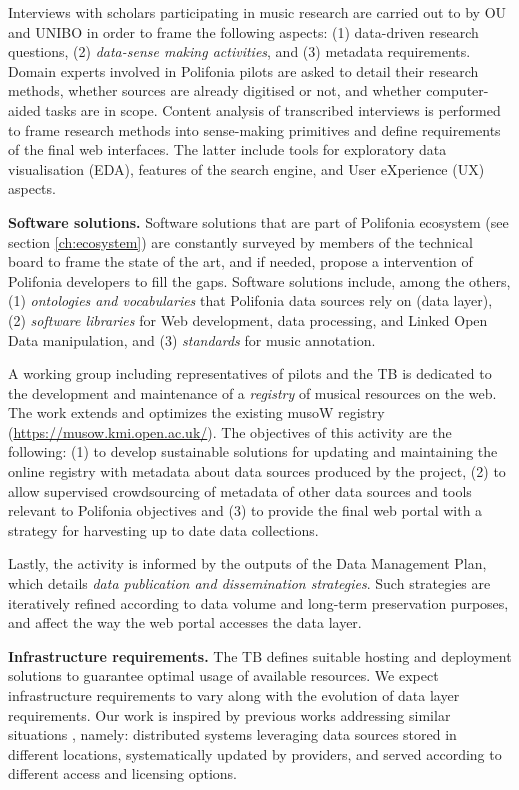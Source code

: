 
Interviews with scholars participating in music research are carried out to by OU and UNIBO in order to frame the following aspects: (1) data-driven research questions, (2) \emph{data-sense making activities}, and (3) metadata requirements. Domain experts involved in Polifonia pilots are asked to detail their research methods, whether sources are already digitised or not, and whether computer-aided tasks are in scope. Content analysis of transcribed interviews is performed to frame research methods into sense-making primitives and define requirements of the final web interfaces. The latter include tools for exploratory data visualisation (EDA), features of the search engine, and User eXperience (UX) aspects. 

\textbf{Software solutions.} Software solutions that are part of Polifonia ecosystem (see section \ref{ch:ecosystem}) are constantly surveyed by members of the technical board to frame the state of the art, and if needed, propose a intervention of Polifonia developers to fill the gaps. Software solutions include, among the others, (1) \emph{ontologies and vocabularies} that Polifonia data sources rely on (data layer), (2) \emph{software libraries} for Web development, data processing, and Linked Open Data manipulation, and (3) \emph{standards} for music annotation.

A working group including representatives of pilots and the TB is dedicated to the development and maintenance of a \emph{registry} of musical resources on the web. The work extends and optimizes the existing musoW registry (\url{https://musow.kmi.open.ac.uk/}). The objectives of this activity are the following: (1) to develop sustainable solutions for updating and maintaining the online registry with metadata about data sources produced by the project, (2) to allow supervised crowdsourcing of metadata of other data sources and tools relevant to Polifonia objectives and (3) to provide the final web portal with a strategy for harvesting up to date data collections.

Lastly, the activity is informed by the outputs of the Data Management Plan, which details \emph{data publication and dissemination strategies}. Such strategies are iteratively refined according to data volume and long-term preservation purposes, and affect the way the web portal accesses the data layer. 

\textbf{Infrastructure requirements.} The TB defines suitable hosting and deployment solutions to guarantee optimal usage of available resources. We expect infrastructure requirements to vary along with the evolution of data layer requirements. Our work is inspired by previous works addressing similar situations \cite{kirstein2019european,kirstein2020piveau}, namely: distributed systems leveraging data sources stored in different locations, systematically updated by providers, and served according to different access and licensing options.

